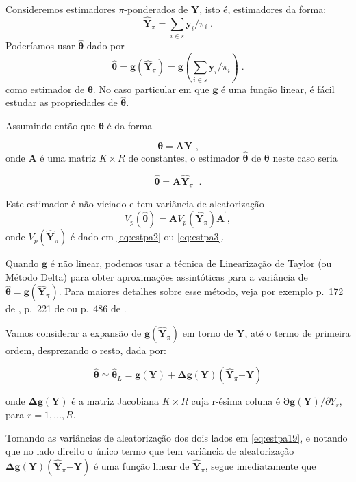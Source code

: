 \documentclass[]{book}
\theoremstyle{definition}
\theoremstyle{definition}
\theoremstyle{definition}
\theoremstyle{remark}
\begin{document}
Consideremos estimadores \(\pi\)-ponderados de \(\mathbf{Y}\), isto é,
estimadores da forma: \[
\widehat{\mathbf{Y}}_{\pi }=\sum_{i\in s}\mathbf{y}_{i}/\pi _{i}\;. 
\] Poderíamos usar \(\mathbf{\hat{\theta}}\) dado por \[
\mathbf{\hat{\theta}}=\mathbf{g}\left( \widehat{\mathbf{Y}}_{\pi }\right) =\mathbf{g}(\sum_{i\in s}\mathbf{y}_{i}/\pi _{i})\;. 
\] como estimador de \(\mathbf{\theta}\). No caso particular em que
\(\mathbf{g}\) é uma função linear, é fácil estudar as propriedades de
\(\mathbf{\hat{\theta}}\).

Assumindo então que \(\mathbf{\theta}\) é da forma

\[
\mathbf{\theta }=\mathbf{AY}\mbox{ ,} 
\] onde \(\mathbf{A}\) é uma matriz \(K\times R\) de constantes, o
estimador \(\mathbf{\hat{\theta}}\) de \(\mathbf{\theta }\) neste caso
seria

\[
\mathbf{\hat{\theta}}=\mathbf{A\hat{Y}}_{\pi }\;\;. 
\]

Este estimador é não-viciado e tem variância de aleatorização \[
V_{p}\left( \mathbf{\hat{\theta}}\right) =\mathbf{A}V_{p}\left( \mathbf{\hat{Y}}_{\pi }\right) \mathbf{A}^{^{\prime }}\mathbf{,} 
\] onde \(V_{p}\left( \mathbf{\hat{Y}}_{\pi }\right)\) é dado em
\eqref{eq:estpa2} ou \eqref{eq:estpa3}.

Quando \(\mathbf{g}\) é não linear, podemos usar a técnica de
Linearização de Taylor (ou Método Delta) para obter aproximações
assintóticas para a variância de
\(\mathbf{\hat{\theta}}=\mathbf{g}\left( \widehat{\mathbf{Y}}_{\pi }\right)\).
Para maiores detalhes sobre esse método, veja por exemplo p.~172 de
\citep{SSW92}, p.~221 de \citep{W85} ou p.~486 de \citep{Bishop}.

Vamos considerar a expansão de
\(\mathbf{g}\left( \mathbf{\hat{Y}}_{\pi }\right)\) em torno de
\(\mathbf{Y}\), até o termo de primeira ordem, desprezando o resto, dada
por:

\begin{equation}
\mathbf{\hat{\theta}\simeq \hat{\theta}}_{L}=\mathbf{g(Y)+\Delta g(Y)}\left( 
\mathbf{\hat{Y}}_{\pi }\mathbf{-Y}\right)  \label{eq:estpa19}
\end{equation}

onde \(\mathbf{\Delta g(Y)}\) é a matriz Jacobiana \(K\times R\) cuja
r-ésima coluna é \(\mathbf{\partial g(Y)/}\partial Y_{r}\),\\
para \(r=1,\ldots,R\).

Tomando as variâncias de aleatorização dos dois lados em
\eqref{eq:estpa19}, e notando que no lado direito o único termo que tem
variância de aleatorização
\(\mathbf{\Delta g(Y)}\left( \mathbf{\hat{Y}}_{\pi }\mathbf{-Y}\right)\)
é uma função linear de \(\mathbf{\hat{Y}}_{\pi}\), segue imediatamente
que
\end{document}
